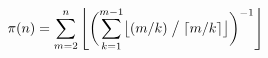 $$
\pi(n)=\sum_{m=2}^n \left \lfloor \biggl (\sum_{k=1}^{m-1}
\bigl \lfloor (m/k) \bigm / \lceil m/k \rceil \bigr \rfloor \biggr )^{-1}
\right \rfloor
$$


\bye


